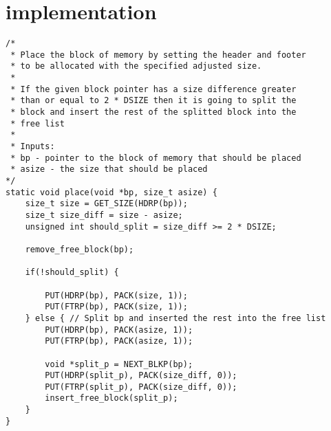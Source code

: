 \section{ implementation} \label{appendix:place}

\begin{lstlisting}
/*
 * Place the block of memory by setting the header and footer
 * to be allocated with the specified adjusted size.
 * 
 * If the given block pointer has a size difference greater 
 * than or equal to 2 * DSIZE then it is going to split the
 * block and insert the rest of the splitted block into the 
 * free list
 * 
 * Inputs:
 * bp - pointer to the block of memory that should be placed
 * asize - the size that should be placed
*/
static void place(void *bp, size_t asize) {
    size_t size = GET_SIZE(HDRP(bp));
    size_t size_diff = size - asize;
    unsigned int should_split = size_diff >= 2 * DSIZE;
    
    remove_free_block(bp);

    if(!should_split) {

        PUT(HDRP(bp), PACK(size, 1));
        PUT(FTRP(bp), PACK(size, 1)); 
    } else { // Split bp and inserted the rest into the free list
        PUT(HDRP(bp), PACK(asize, 1));
        PUT(FTRP(bp), PACK(asize, 1));

        void *split_p = NEXT_BLKP(bp);
        PUT(HDRP(split_p), PACK(size_diff, 0));
        PUT(FTRP(split_p), PACK(size_diff, 0));
        insert_free_block(split_p);
    }
}

\end{lstlisting}